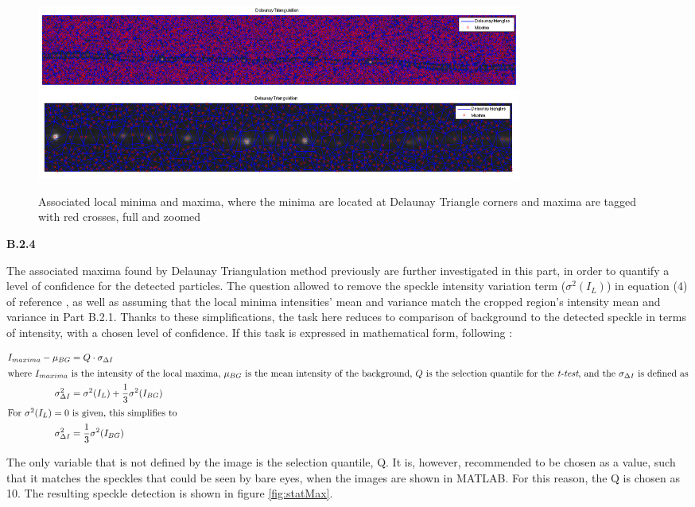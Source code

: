 \documentclass{article}
\begin{document}
\begin{figure}[h]
\centering
\includegraphics[width=16cm]{figures/delaunay_full.png}
\includegraphics[width=16cm]{figures/delaunay_zoom.png}
\caption{Associated local minima and maxima, where the minima are located at Delaunay Triangle corners and maxima are tagged with red crosses, full and zoomed}
\label{fig:assocLocal}
\end{figure}



\textbf{B.2.4}
 
The associated maxima found by Delaunay Triangulation method previously are further investigated in this part, in order to quantify a level of confidence for the detected particles. The question allowed to remove the speckle intensity variation term ($\sigma^2(I_L)$) in equation (4) of reference \cite{ponti}, as well as assuming that the local minima intensities' mean and variance match the cropped region's intensity mean and variance in Part B.2.1. Thanks to these simplifications, the task here reduces to comparison of background to the detected speckle in terms of intensity, with a chosen level of confidence. If this task is expressed in mathematical form, following \cite{ponti}:

\begin{align}
I_{maxima} - \mu_{BG} &= Q\cdot \sigma_{\Delta I}\\
\intertext{where $I_{maxima}$ is the intensity of the local maxima, $\mu_{BG}$ is the mean intensity of the background, $Q$ is the selection quantile for the \emph{t-test}, and the $\sigma_{\Delta I}$ is defined as}
\sigma^2_{\Delta I} &= \sigma^2(I_L) + \frac{1}{3}\sigma^2(I_{BG}) \nonumber \\
\intertext{For $\sigma^2(I_L)=0$ is given, this simplifies to}
\sigma^2_{\Delta I} &= \frac{1}{3}\sigma^2(I_{BG})
\end{align}

The only variable that is not defined by the image is the selection quantile, Q. It is, however, recommended to be chosen as a value, such that it matches the speckles that could be seen by bare eyes, when the images are shown in MATLAB. For this reason, the Q is chosen as 10. The resulting speckle detection is shown in figure \ref{fig:statMax}.
\end{document}
